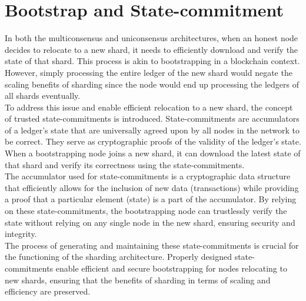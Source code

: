 \documentclass{report}
\begin{document}
\section{ Bootstrap and State-commitment}
In both the multiconsensus and uniconsensus architectures, when an honest node decides to relocate to a new shard, it needs to efficiently download and verify the state of that shard. This process is akin to bootstrapping in a blockchain context. However, simply processing the entire ledger of the new shard would negate the scaling benefits of sharding since the node would end up processing the ledgers of all shards eventually.\\
To address this issue and enable efficient relocation to a new shard, the concept of trusted state-commitments is introduced. State-commitments are accumulators of a ledger's state that are universally agreed upon by all nodes in the network to be correct. They serve as cryptographic proofs of the validity of the ledger's state. When a bootstrapping node joins a new shard, it can download the latest state of that shard and verify its correctness using the state-commitments.\\
The accumulator used for state-commitments is a cryptographic data structure that efficiently allows for the inclusion of new data (transactions) while providing a proof that a particular element (state) is a part of the accumulator. By relying on these state-commitments, the bootstrapping node can trustlessly verify the state without relying on any single node in the new shard, ensuring security and integrity.\\
The process of generating and maintaining these state-commitments is crucial for the functioning of the sharding architecture. Properly designed state-commitments enable efficient and secure bootstrapping for nodes relocating to new shards, ensuring that the benefits of sharding in terms of scaling and efficiency are preserved.
\end{document}
